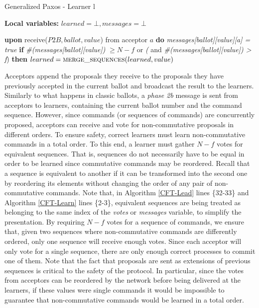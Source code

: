 \begin{algorithm}
	\caption{Generalized Paxos - Learner l}
	\label{CFT-Learn}
	\textbf{Local variables: } $learned = \bot, messages = \bot$ 
	\begin{algorithmic}[1]
		\State \textbf{upon} receive($P2B, ballot, value$) from acceptor $a$ \textbf{do}
		\State \hspace{\algorithmicindent} \emph{messages[ballot][value][a] = true}
		\State \hspace{\algorithmicindent} \textbf{if} \emph{\#(messages[ballot][value])} $\geq N-f$ or \emph{(} and \emph{\#(messages[ballot][value]) > f}) \textbf{then}
		\State \hspace{\algorithmicindent} \hspace{\algorithmicindent} $learned = \Call{merge\_sequences}{learned, value}$
	\end{algorithmic}
\end{algorithm}

Acceptors append the proposals they receive to the proposals they have previously accepted in the current ballot and broadcast the result to the learners. Similarly to what happens in classic ballots, a \textit{phase 2b} message is sent from acceptors to learners, containing the current ballot number and the command sequence. However, since commands (or sequences of commands) are concurrently proposed, acceptors can receive and vote for non-commutative proposals in different orders. To ensure safety, correct learners must learn non-commutative commands in a total order. To this end, a learner must gather $N-f$ votes for equivalent sequences. That is, sequences do not necessarily have to be equal in order to be learned since commutative commands may be reordered. Recall that a sequence is equivalent to another if it can be transformed into the second one by reordering its elements without changing the order of any pair of non-commutative commands. Note that, in Algorithm \ref{CFT-Lead} lines \{32-33\} and Algorithm \ref{CFT-Learn} lines \{2-3\}, equivalent sequences are being treated as belonging to the same index of the \textit{votes} or \emph{messages} variable, to simplify the presentation. By requiring $N-f$ votes for a sequence of commands, we ensure that, given two sequences where non-commutative commands are differently ordered, only one sequence will receive enough votes. Since each acceptor will only vote for a single sequence, there are only enough correct processes to commit one of them. Note that the fact that proposals are sent as extensions of previous sequences is critical to the safety of the protocol. In particular, since the votes from acceptors can be reordered by the network before being delivered at the learners, if these values were single commands it would be impossible to guarantee that non-commutative commands would be learned in a total order. \par

